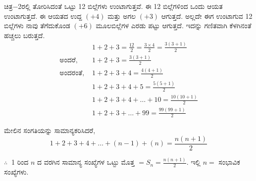 ಚಿತ್ರ$-$2ರಲ್ಲಿ ತೋರಿಸಿದಂತೆ ಒಟ್ಟು 12 ಬಿಲ್ಲೆಗಳು ಉಂಟಾಗುತ್ತವೆ. ಈ 12 ಬಿಲ್ಲೆ\break ಗಳಿಂದ \hbox{ಒಂದು} ಆಯತ ಉಂಟಾಗುತ್ತದೆ. ಈ ಆಯತದ ಉದ್ದ $(+4)$ ಮತ್ತು ಅಗಲ $(+3)$ ಆಗುತ್ತದೆ. ಅಲ್ಲದೇ ಈಗ ಉಂಟಾಗುವ 12 ಬಿಲ್ಲೆಗಳು ನಾವು ತೆಗೆದುಕೊಂಡ $(+6)$ ಮೂಲಬಿಲ್ಲೆಗಳ ಎರಡು ಪಟ್ಟು ಆಗುತ್ತದೆ. ಇದನ್ನು ಗಣಿತವಾಗಿ ಕೆಳಗಿನಂತೆ ಹಚ್ಚಲು ಬರುತ್ತದೆ. 
\begin{align*}
& 1 + 2 + 3 = \frac{12}{2} = \frac{3 \times 4}{2} = \frac{3(3+1)}{2}\\
\text{ಅಂದರೆ, } & 1 + 2 + 3 = \frac{3(3+1)}{2}\\
\text{ಅಂದರಂತೆ, } & 1 + 2 + 3 + 4 = \frac{4(4+1)}{2}\\
& 1 + 2 + 3 + 4 + 5 = \frac{5(5+1)}{2}\\
& 1 + 2 + 3 + 4 + \hdots + 10 = \frac{10(10+1)}{2}\\
& 1 + 2 + 3 + \hdots + 99 = \frac{99(99+1)}{2}
\end{align*}

ಮೇಲಿನ ಸಂಗತಿಯನ್ನು ಸಾಮಾನ್ಯಕರಿಸಿದರೆ,
$$
1 + 2 + 3 + 4 + \hdots + (n-1) + (n) = \frac{n(n+1)}{2}
$$

$\therefore~$ 1 ರಿಂದ $n$ ದ ವರಗಿನ ಸಾಮಾನ್ಯ ಸಂಖ್ಯೆಗಳ ಒಟ್ಟು ಮೊತ್ತ $= S_{n} = \frac{n(n+1)}{2}$. ಇಲ್ಲಿ $n =$ ಸಂಭಾವಿಕ ಸಂಖ್ಯೆಗಳು. 
